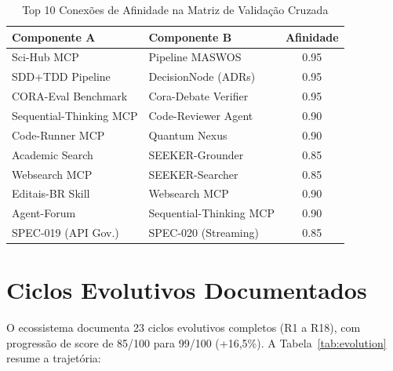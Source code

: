 \begin{table}[H]
\centering
\caption{Top 10 Conexões de Afinidade na Matriz de Validação Cruzada}
\label{tab:affinity}
\begin{tabular}{p{5.5cm}p{5.5cm}c}
\toprule
\textbf{Componente A} & \textbf{Componente B} & \textbf{Afinidade} \\
\midrule
Sci-Hub MCP & Pipeline MASWOS & 0.95 \\
SDD+TDD Pipeline & DecisionNode (ADRs) & 0.95 \\
CORA-Eval Benchmark & Cora-Debate Verifier & 0.95 \\
Sequential-Thinking MCP & Code-Reviewer Agent & 0.90 \\
Code-Runner MCP & Quantum Nexus & 0.90 \\
Academic Search & SEEKER-Grounder & 0.85 \\
Websearch MCP & SEEKER-Searcher & 0.85 \\
Editais-BR Skill & Websearch MCP & 0.90 \\
Agent-Forum & Sequential-Thinking MCP & 0.90 \\
SPEC-019 (API Gov.) & SPEC-020 (Streaming) & 0.85 \\
\bottomrule
\end{tabular}
\end{table}

\section{Ciclos Evolutivos Documentados}

O ecossistema documenta 23 ciclos evolutivos completos (R1 a R18), com progressão de score de 85/100 para 99/100 (+16,5\%). A Tabela~\ref{tab:evolution} resume a trajetória:

